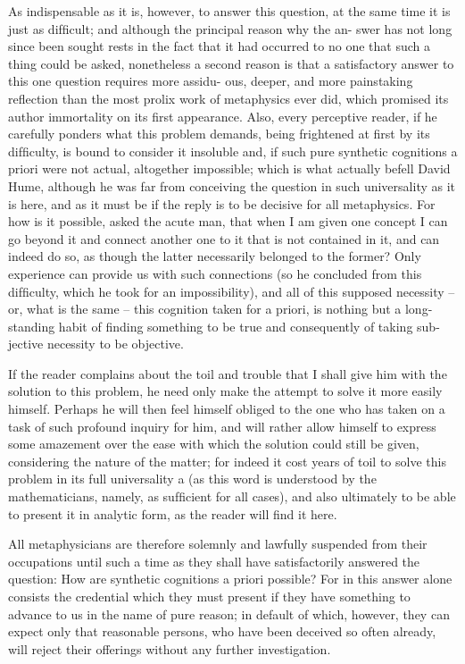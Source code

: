 As indispensable as it is, however, to answer this question, at the same
time it is just as difﬁcult; and although the principal reason why the an-
swer has not long since been sought rests in the fact that it had occurred
to no one that such a thing could be asked, nonetheless a second reason
is that a satisfactory answer to this one question requires more assidu-
ous, deeper, and more painstaking reﬂection than the most prolix work
of metaphysics ever did, which promised its author immortality on its
ﬁrst appearance. Also, every perceptive reader, if he carefully ponders
what this problem demands, being frightened at ﬁrst by its difﬁculty, is
bound to consider it insoluble and, if such pure synthetic cognitions a
priori were not actual, altogether impossible; which is what actually befell
David Hume, although he was far from conceiving the question in such
universality as it is here, and as it must be if the reply is to be decisive for
all metaphysics. For how is it possible, asked the acute man, that when
I am given one concept I can go beyond it and connect another one to
it that is not contained in it, and can indeed do so, as though the latter
necessarily belonged to the former? Only experience can provide us with
such connections (so he concluded from this difﬁculty, which he took
for an impossibility), and all of this supposed necessity – or, what is the
same – this cognition taken for a priori, is nothing but a long-standing
habit of ﬁnding something to be true and consequently of taking sub-
jective necessity to be objective.

If the reader complains about the toil and trouble that I shall give
him with the solution to this problem, he need only make the attempt
to solve it more easily himself. Perhaps he will then feel himself obliged
to the one who has taken on a task of such profound inquiry for him,
and will rather allow himself to express some amazement over the ease
with which the solution could still be given, considering the nature of
the matter; for indeed it cost years of toil to solve this problem in its full
universality a (as this word is understood by the mathematicians, namely,
as sufﬁcient for all cases), and also ultimately to be able to present it in
analytic form, as the reader will ﬁnd it here.

All metaphysicians are therefore solemnly and lawfully suspended
from their occupations until such a time as they shall have satisfactorily
answered the question: How are synthetic cognitions a priori possible? For in
this answer alone consists the credential which they must present if they
have something to advance to us in the name of pure reason; in default
of which, however, they can expect only that reasonable persons, who
have been deceived so often already, will reject their offerings without
any further investigation.

